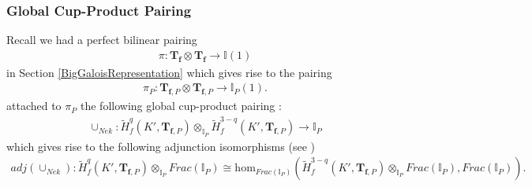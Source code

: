 \documentclass[reqno,10pt]{amsart}
\newcommand{\I}{\mathbb{I}}
\newcommand{\f}{\mathbf{f}}
\newcommand{\T}{\mathbf{T}}
\newcommand{\ip}{\I_P}
\newcommand{\tfp}{\mathbf{T}_{\mathbf{f},P}}
\theoremstyle{plain}
\theoremstyle{definition}
\begin{document}
\subsubsection{Global Cup-Product Pairing}
Recall we had a perfect bilinear pairing 
\begin{align*}
    \pi : \T_\f \otimes \T_\f \rightarrow \I(1)
\end{align*}
in Section \ref{BigGaloisRepresentation} which gives rise to the pairing
\begin{align*}
    \pi_P : \tfp \otimes \tfp \rightarrow \ip(1).
\end{align*} 
\cite[Section 6.3]{Nekovar} attached to $\pi_P$ the following global cup-product pairing :
\begin{align*}
    \cup_{Nek} : \widetilde{H}^q_f(K',\T_{\f,P}) \otimes_{\ip} \widetilde{H}^{3-q}_f(K',\T_{\f,P}) \rightarrow \ip
\end{align*}
which gives rise to the following adjunction isomorphisms (see \cite[Proposition 6.7.7]{Nekovar})
\begin{align} \label{H^1-H^2 relation}
    adj(\cup_{Nek}) : \widetilde{H}^q_f(K',\T_{\f,P}) \otimes_{\ip} Frac(\ip) \cong \mathrm{hom}_{Frac(\ip)}(\widetilde{H}^{3-q}_f(K',\T_{\f,P}) \otimes_{\ip} Frac(\ip), Frac(\ip)).
\end{align}
\end{document}
